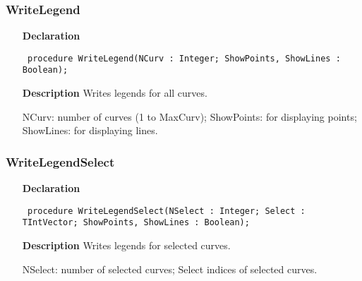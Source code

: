 \documentclass[12pt,a4paper,oneside]{report}
\newcommand{\declarationitem}[1]{\textbf{#1}}
\newcommand{\descriptiontitle}[1]{\textbf{#1}}
\newcommand{\code}[1]{\texttt{#1}}
\begin{document}
\subsubsection{WriteLegend}
\label{uplot-WriteLegend}
\begin{itemize}\item[\declarationitem{Declaration}\hfill]
	\begin{flushleft}
		\code{
			procedure WriteLegend(NCurv : Integer; ShowPoints, ShowLines : Boolean);}
		
	\end{flushleft}
	
	\par
	\item[\descriptiontitle{Description}]
	Writes legends for all curves.
	
	NCurv: number of curves (1 to MaxCurv); ShowPoints: for displaying points; ShowLines: for displaying lines.
	
\end{itemize}
\subsubsection{WriteLegendSelect}
\label{uplot-WriteLegendSelect}
\begin{itemize}\item[\declarationitem{Declaration}\hfill]
	\begin{flushleft}
		\code{
			procedure WriteLegendSelect(NSelect : Integer; Select : TIntVector; ShowPoints, ShowLines : Boolean);}
		
	\end{flushleft}
	
	\par
	\item[\descriptiontitle{Description}]
	Writes legends for selected curves.
	
	NSelect: number of selected curves; Select  indices of selected curves.
	
\end{itemize}
\end{document}
